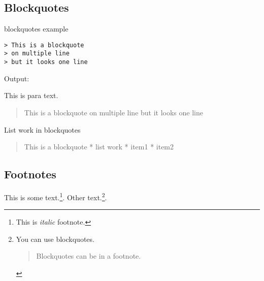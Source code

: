 \documentclass[a4j, titlepage]{jarticle}
\begin{document}
\subsection{Blockquotes}

\begin{itembox}[c]{blockquotes example}
\begin{verbatim}
> This is a blockquote
> on multiple line
> but it looks one line
\end{verbatim}
\end{itembox}

Output:

This is para text.

\begin{quote}
This is a blockquote
on multiple line
but it looks one line
\end{quote}

List work in blockquotes

\begin{quote}
This is a blockquote
* list work
* item1
* item2
\end{quote}

\subsection{Footnotes}

This is some text.\footnote{This is \emph{italic} footnote.}. Other text.\footnote{You can use blockquotes.

\begin{quote}
Blockquotes can be in a footnote.
\end{quote}}.

\end{document}
